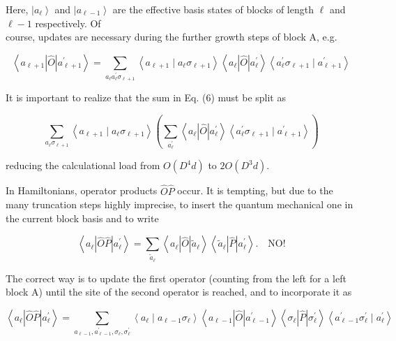 \documentclass[12pt]{article}
\begin{document}
Here, $\left|a_{\ell}\right\rangle$ and $\left|a_{\ell-1}\right\rangle$ are the effective basis states of blocks of length $\ell$ and $\ell-1$ respectively. Of\\
course, updates are necessary during the further growth steps of block A, e.g.


\begin{equation*}
\left\langle a_{\ell+1}|\hat{O}| a_{\ell+1}^{\prime}\right\rangle=\sum_{a_{\ell} a_{\ell}^{\prime} \sigma_{\ell+1}}\left\langle a_{\ell+1} \mid a_{\ell} \sigma_{\ell+1}\right\rangle\left\langle a_{\ell}|\hat{O}| a_{\ell}^{\prime}\right\rangle\left\langle a_{\ell}^{\prime} \sigma_{\ell+1} \mid a_{\ell+1}^{\prime}\right\rangle \tag{6}
\end{equation*}


It is important to realize that the sum in Eq. (6) must be split as


\begin{equation*}
\sum_{a_{\ell} \sigma_{\ell+1}}\left\langle a_{\ell+1} \mid a_{\ell} \sigma_{\ell+1}\right\rangle\left(\sum_{a_{\ell}^{\prime}}\left\langle a_{\ell}|\hat{O}| a_{\ell}^{\prime}\right\rangle\left\langle a_{\ell}^{\prime} \sigma_{\ell+1} \mid a_{\ell+1}^{\prime}\right\rangle\right) \tag{7}
\end{equation*}


reducing the calculational load from $O\left(D^{4} d\right)$ to $2 O\left(D^{3} d\right)$.

In Hamiltonians, operator products $\hat{O} \hat{P}$ occur. It is tempting, but due to the many truncation steps highly imprecise, to insert the quantum mechanical one in the current block basis and to write


\begin{equation*}
\left\langle a_{\ell}|\hat{O} \hat{P}| a_{\ell}^{\prime}\right\rangle=\sum_{\tilde{a}_{\ell}}\left\langle a_{\ell}|\hat{O}| \tilde{a}_{\ell}\right\rangle\left\langle\tilde{a}_{\ell}|\hat{P}| a_{\ell}^{\prime}\right\rangle . \quad \mathrm{NO!} \tag{8}
\end{equation*}


The correct way is to update the first operator (counting from the left for a left block A) until the site of the second operator is reached, and to incorporate it as


\begin{equation*}
\left\langle a_{\ell}|\hat{O} \hat{P}| a_{\ell}^{\prime}\right\rangle=\sum_{a_{\ell-1}, a_{\ell-1}^{\prime}, \sigma_{\ell}, \sigma_{\ell}^{\prime}}\left\langle a_{\ell} \mid a_{\ell-1} \sigma_{\ell}\right\rangle\left\langle a_{\ell-1}|\hat{O}| a_{\ell-1}^{\prime}\right\rangle\left\langle\sigma_{\ell}|\hat{P}| \sigma_{\ell}^{\prime}\right\rangle\left\langle a_{\ell-1}^{\prime} \sigma_{\ell}^{\prime} \mid a_{\ell}^{\prime}\right\rangle \tag{9}
\end{equation*}
\end{document}
